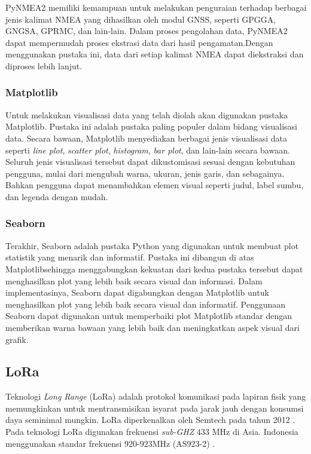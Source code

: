PyNMEA2 memiliki kemampuan untuk melakukan penguraian terhadap berbagai jenis kalimat NMEA yang dihasilkan oleh modul GNSS, seperti GPGGA, GNGSA, GPRMC, dan lain-lain. Dalam proses pengolahan data, PyNMEA2 dapat mempermudah proses ekstrasi data dari hasil pengamatan.Dengan menggunakan pustaka ini, data dari setiap kalimat NMEA dapat diekstraksi dan diproses lebih lanjut.

\subsubsection{Matplotlib}
Untuk melakukan visualisasi data yang telah diolah akan digunakan pustaka Matplotlib. Pustaka ini adalah pustaka paling populer dalam bidang visualisasi data. Secara bawaan, Matplotlib menyediakan berbagai jenis visualisasi data seperti \textit{line plot}, \textit{scatter plot}, \textit{histogram}, \textit{bar plot}, dan lain-lain secara bawaan. Seluruh jenis visualisasi tersebut dapat dikustomisasi sesuai dengan kebutuhan pengguna, mulai dari mengubah warna, ukuran, jenis garis, dan sebagainya. Bahkan pengguna dapat menambahkan elemen visual seperti judul, label sumbu, dan legenda dengan mudah.

\subsubsection{Seaborn}
Terakhir, Seaborn adalah pustaka Python yang digunakan untuk membuat plot statistik yang menarik dan informatif. Pustaka ini dibangun di atas Matplotlibsehingga menggabungkan kekuatan dari kedua pustaka tersebut dapat menghasilkan plot yang lebih baik secara visual dan informasi. Dalam implementasinya, Seaborn dapat digabungkan dengan Matplotlib untuk menghasilkan plot yang lebih baik secara visual dan informatif. Penggunaan Seaborn dapat digunakan untuk memperbaiki plot Matplotlib standar dengan memberikan warna bawaan yang lebih baik dan meningkatkan aspek visual dari grafik.

\iffalse
\subsection{LoRa}
Teknologi \textit{Long Range} (LoRa) adalah protokol komunikasi pada lapiran fisik yang memungkinkan untuk mentransmisikan isyarat pada jarak jauh dengan konsumsi daya seminimal mungkin. LoRa diperkenalkan oleh Semtech pada tahun 2012 \cite{Oliveira2017}. Pada teknologi LoRa digunakan frekuensi \textit{sub-GHZ} 433 MHz di Asia. Indonesia menggunakan standar frekuensi 920-923MHz (AS923-2) \cite{LoRa2020}.

